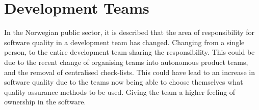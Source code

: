 



\section{Development Teams}
In the Norwegian public sector, it is described that the area of responsibility for software quality in a development team has changed. Changing from a single person, to the entire development team sharing the responsibility. This could be due to the recent change of organising teams into autonomous product teams, and the removal of centralised check-lists. This could have lead to an increase in software quality due to the teams now being able to choose themselves what quality assurance methods to be used. Giving the team a higher feeling of ownership in the software.

